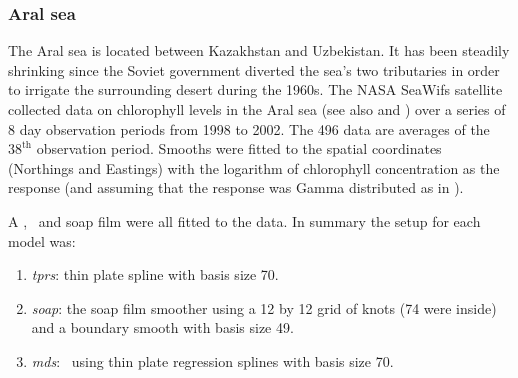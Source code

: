 \subsubsection{Aral sea}
\label{aral-sec}

The Aral sea is located between Kazakhstan and Uzbekistan. It has been steadily shrinking since the Soviet government diverted the sea's two tributaries in order to irrigate the surrounding desert during the 1960s. The NASA SeaWifs satellite collected data on chlorophyll levels in the Aral sea (see also  and \cite{soap}) over a series of 8 day observation periods from 1998 to 2002. The 496 data are averages of the $38^\text{th}$ observation period. Smooths were fitted to the spatial coordinates (Northings and Eastings) with the logarithm of chlorophyll concentration as the response (and assuming that the response was Gamma distributed as in \cite{soap}).

A \tprs, \mdsap\ and soap film were all fitted to the data. In summary the setup for each model was:
\begin{enumerate}
\item \emph{tprs}: thin plate spline with basis size 70.
\item \emph{soap}: the soap film smoother using a 12 by 12 grid of knots (74 were inside) and a boundary smooth with basis size 49.
\item \emph{mds}: \mdsap\ using thin plate regression splines with basis size 70.
\end{enumerate}


